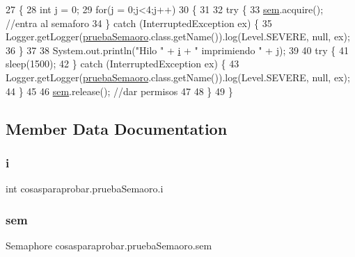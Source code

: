 \begin{DoxyCode}
27                      \{
28         \textcolor{keywordtype}{int} j = 0;
29         \textcolor{keywordflow}{for}(j = 0;j<4;j++)
30         \{
31             
32         \textcolor{keywordflow}{try} \{
33             \mbox{\hyperlink{classcosasparaprobar_1_1prueba_semaoro_aff63c1c25145c5470c86f8b97fa93c81}{sem}}.acquire(); \textcolor{comment}{//entra al semaforo}
34         \} \textcolor{keywordflow}{catch} (InterruptedException ex) \{
35             Logger.getLogger(\mbox{\hyperlink{classcosasparaprobar_1_1prueba_semaoro_a73082d9634e3a14bcdc678355a0930ca}{pruebaSemaoro}}.class.getName()).log(Level.SEVERE, null, ex);
36         \}
37         
38         System.out.println(\textcolor{stringliteral}{"Hilo "} + \mbox{\hyperlink{classcosasparaprobar_1_1prueba_semaoro_a9b8c78f7d8f806c59eef71f170426c0b}{i}} + \textcolor{stringliteral}{" imprimiendo "} + j);
39         
40             \textcolor{keywordflow}{try} \{
41                 sleep(1500);
42             \} \textcolor{keywordflow}{catch} (InterruptedException ex) \{
43                 Logger.getLogger(\mbox{\hyperlink{classcosasparaprobar_1_1prueba_semaoro_a73082d9634e3a14bcdc678355a0930ca}{pruebaSemaoro}}.class.getName()).log(Level.SEVERE, null, ex);
44             \}
45             
46         \mbox{\hyperlink{classcosasparaprobar_1_1prueba_semaoro_aff63c1c25145c5470c86f8b97fa93c81}{sem}}.release(); \textcolor{comment}{//dar permisos}
47         
48         \}
49     \}
\end{DoxyCode}


\subsection{Member Data Documentation}
\mbox{\label{classcosasparaprobar_1_1prueba_semaoro_a9b8c78f7d8f806c59eef71f170426c0b}} 
\subsubsection{\texorpdfstring{i}{i}}
{\footnotesize\ttfamily int cosasparaprobar.\+prueba\+Semaoro.\+i\hspace{0.3cm}{\ttfamily [private]}}

\mbox{\label{classcosasparaprobar_1_1prueba_semaoro_aff63c1c25145c5470c86f8b97fa93c81}} 
\subsubsection{\texorpdfstring{sem}{sem}}
{\footnotesize\ttfamily Semaphore cosasparaprobar.\+prueba\+Semaoro.\+sem\hspace{0.3cm}{\ttfamily [private]}}

